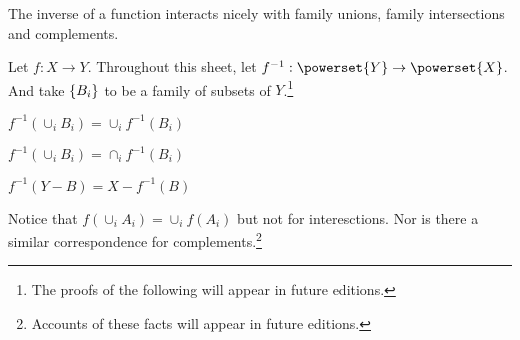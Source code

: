 

The inverse of a function interacts nicely with family unions, family intersections and complements.


Let $f: X \to Y$.
Throughout this sheet, let $f^{-1}: \powerset{Y} \to \powerset{X}$.
And take $\{B_i\}$ to be a family of subsets of $Y$.\footnote{The proofs of the following will appear in future editions.}

\begin{proposition}
  $f^{-1}(\cup_i B_i) = \cup_{i} f^{-1}(B_i)$
\end{proposition}

\begin{proposition}
  $f^{-1}(\cup_i B_i) = \cap_{i} f^{-1}(B_i)$
\end{proposition}

\begin{proposition}
  $f^{-1}(Y - B) = X - f^{-1}(B)$
\end{proposition}


Notice that $f(\cup_i A_i) = \cup_i f(A_i)$ but not for interesctions.
Nor is there a similar correspondence for complements.\footnote{Accounts of these facts will appear in future editions.}

\blankpage
